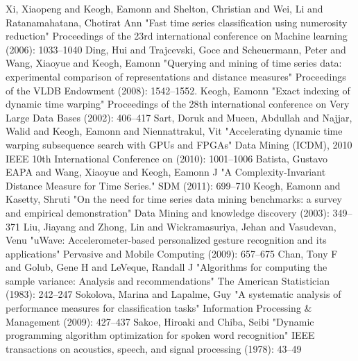 \begin{thebibliography}{1} 
     Xi, Xiaopeng and Keogh, Eamonn and Shelton, Christian and Wei, Li and Ratanamahatana, Chotirat
    Ann "Fast time series classification using numerosity reduction" Proceedings of the 23rd international conference on
    Machine learning (2006): 1033--1040
     Ding, Hui and Trajcevski, Goce and Scheuermann, Peter and Wang, Xiaoyue and Keogh, Eamonn
    "Querying and mining of time series data: experimental comparison of representations and distance measures"
    Proceedings of the VLDB Endowment (2008): 1542--1552.
     Keogh, Eamonn "Exact indexing of dynamic time warping" Proceedings of the 28th
    international conference on Very Large Data Bases (2002): 406--417
     Sart, Doruk and Mueen, Abdullah and Najjar, Walid and Keogh, Eamonn and
    Niennattrakul, Vit "Accelerating dynamic time warping subsequence search with GPUs and FPGAs" Data Mining (ICDM),
    2010 IEEE 10th International Conference on (2010): 1001--1006
     Batista, Gustavo EAPA and Wang, Xiaoyue and Keogh, Eamonn J "A
    Complexity-Invariant Distance Measure for Time Series." SDM (2011): 699--710
     Keogh, Eamonn and Kasetty, Shruti "On the need for time series data mining benchmarks: a
    survey and empirical demonstration" Data Mining and knowledge discovery (2003): 349--371
     Liu, Jiayang and Zhong, Lin and Wickramasuriya, Jehan and Vasudevan, Venu "uWave:
    Accelerometer-based personalized gesture recognition and its applications" Pervasive and Mobile Computing
    (2009): 657--675
     Chan, Tony F and Golub, Gene H and LeVeque, Randall J "Algorithms for computing the
    sample variance: Analysis and recommendations" The American Statistician (1983): 242--247
     Sokolova, Marina and Lapalme, Guy "A systematic analysis of performance measures
    for classification tasks" Information Processing \& Management (2009): 427--437
     Sakoe, Hiroaki and Chiba, Seibi "Dynamic programming algorithm optimization for spoken
    word recognition" IEEE transactions on acoustics, speech, and signal processing (1978): 43--49
\end{thebibliography}
